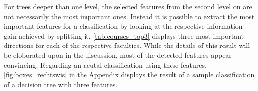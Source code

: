 \begin{figure}[h]
	\begin{center}
	\end{center}
\end{figure}

For trees deeper than one level, the selected features from the second level on are not necessarily the most important ones. Instead it is possible to extract the most important features for a classification by looking at the respective information gain achieved by splitting it. \autoref{tab:courses_top3} displays three most important directions for each of the respective faculties. While the details of this result will be eloborated upon in the discussion, most of the detected features appear convincing. Regarding an acutal classification using these features, \autoref{fig:boxes_rechtswis} in the Appendix displays the result of a sample classification of a decision tree with three features.


